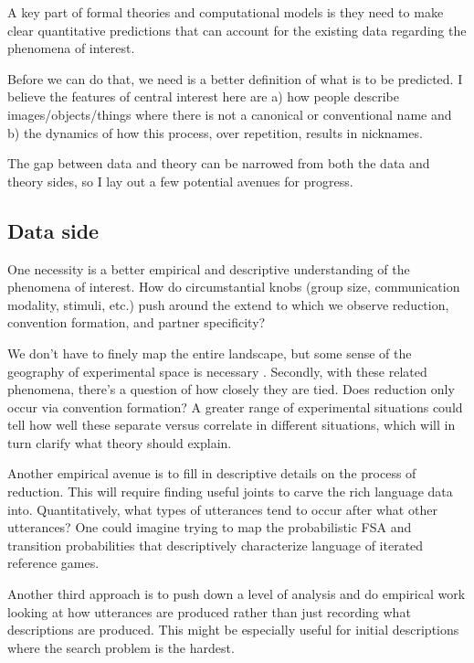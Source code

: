 \documentclass[]{article}
\begin{document}
	A key part of formal theories and computational models is they need to make clear quantitative predictions that can account for the existing data regarding the phenomena of interest. 
	
	
	Before we can do that, we need is a better definition of what is to be predicted. I believe the features of central interest here are a) how people describe images/objects/things where there is not a canonical or conventional name and b) the dynamics of how this process, over repetition, results in nicknames. %
	
 The gap between data and theory can be narrowed from both the data and theory sides, so I lay out a few potential avenues for progress. 

\subsection{Data side}
	
	One necessity is a better empirical and descriptive understanding of the phenomena of interest. How do circumstantial knobs (group size, communication modality, stimuli, etc.) push around the extend to which we observe reduction, convention formation, and partner specificity? 
	
	We don't have to finely map the entire landscape, but some sense of the geography of experimental space is necessary \citep{almaatouq2022}. Secondly, with these related phenomena, there's a question of how closely they are tied. Does reduction only occur via convention formation? A greater range of experimental situations could tell how well these separate versus correlate in different situations, which will in turn clarify what theory should explain. 
	
	Another empirical avenue is to fill in descriptive details on the process of reduction. This will require finding useful joints to carve the rich language data into. Quantitatively, what types of utterances tend to occur after what other utterances? One could imagine trying to map the probabilistic FSA and transition probabilities that descriptively characterize language of iterated reference games.
	
	Another third approach is to push down a level of analysis and do empirical work looking at how utterances are produced rather than just recording what descriptions are produced. This might be especially useful for initial descriptions where the search problem is the hardest. 
	
\end{document}
